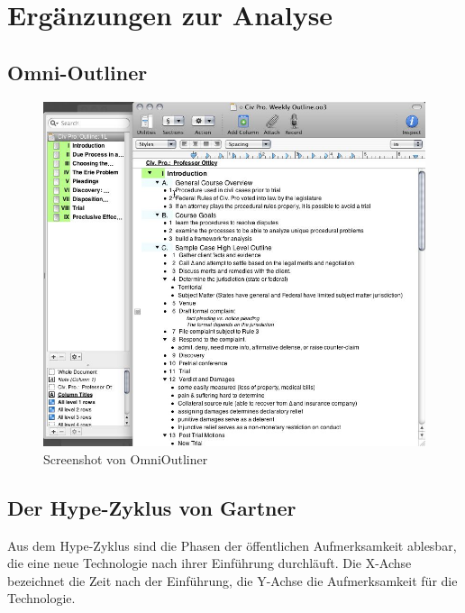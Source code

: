 \section{Ergänzungen zur Analyse}

\subsection{Omni-Outliner}

\medskip
\begin{figure}[ht] 
  \begin{center}
    \includegraphics[width=\textwidth]{grafik/omnioutliner-screenshot} 
  \end{center}
  \caption{Screenshot von OmniOutliner \cite{omnioutliner:screenshot}}
  \label{fig:omnioutliner-screenshot} 
\end{figure}



\subsection{Der Hype-Zyklus von Gartner}
\label{subsec:hype-cycle}

Aus dem Hype-Zyklus sind die Phasen der öffentlichen Aufmerksamkeit ablesbar, die eine neue Technologie nach ihrer Einführung durchläuft. Die X-Achse bezeichnet die Zeit nach der Einführung, die Y-Achse die Aufmerksamkeit für die Technologie. 

